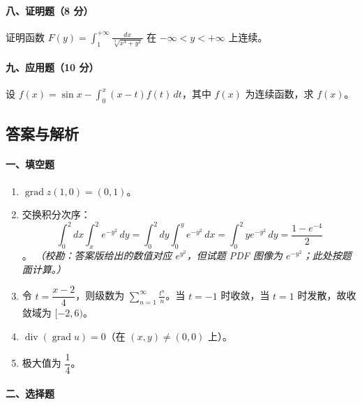 \paragraph*{八、证明题（8 分）}

证明函数 \(\displaystyle F(y)=\int_1^{+\infty}\frac{dx}{\sqrt[3]{x^4+y^2}}\) 在 $-\infty<y<+\infty$ 上连续。

\paragraph*{九、应用题（10 分）}

设 \(\displaystyle f(x)=\sin x-\int_0^x (x-t)f(t)\,dt\)，其中 $f(x)$ 为连续函数，求 $f(x)$。

\subsection{答案与解析}

\paragraph*{一、填空题}

\begin{enumerate}
  \item $\operatorname{grad}z(1,0)=(0,1)$。
  \item 交换积分次序：
  \[
    \int_0^2dx\int_x^2e^{-y^2}\,dy
    =
    \int_0^2dy\int_0^y e^{-y^2}\,dx
    =
    \int_0^2ye^{-y^2}\,dy
    =
    \frac{1-e^{-4}}{2}
  \]
  。
  \textit{（校勘：答案版给出的数值对应 $e^{y^2}$，但试题 PDF 图像为 $e^{-y^2}$；此处按题面计算。）}
  \item 令 $t=\dfrac{x-2}{4}$，则级数为 $\displaystyle\sum_{n=1}^\infty \frac{t^n}{n}$。当 $t=-1$ 时收敛，当 $t=1$ 时发散，故收敛域为 $[-2,6)$。
  \item $\operatorname{div}(\operatorname{grad}u)=0$（在 $(x,y)\ne(0,0)$ 上）。
  \item 极大值为 $\dfrac14$。
\end{enumerate}

\paragraph*{二、选择题}

